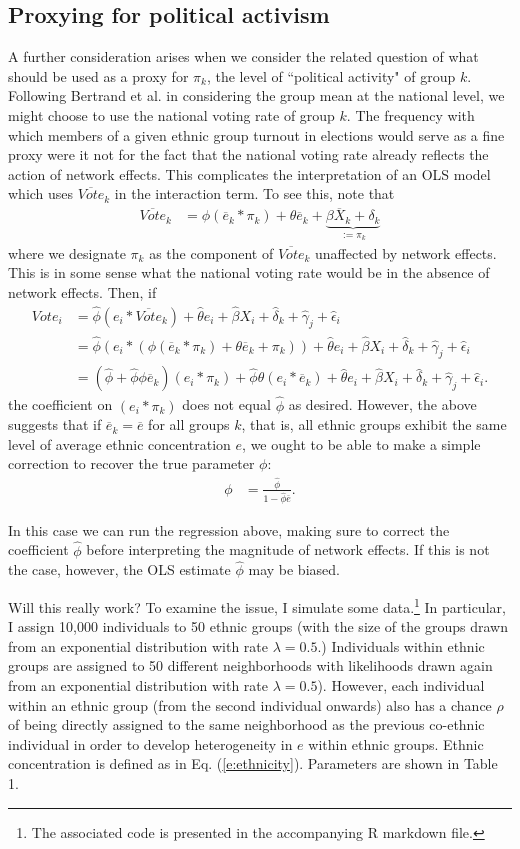 \documentclass[11pt, oneside]{article}   	%
\newcommand{\eq}[1]{\begin{align}#1\end{align}}
\newcommand{\eqs}[1]{\begin{align*}#1\end{align*}}
\begin{document}
\subsection{Proxying for political activism}
A further consideration arises when we consider the related question of what should be used as a proxy for $\pi_k$, the level of ``political activity" of group $k$. Following Bertrand et al. in considering the group mean at the national level, we might choose to use the national voting rate of group $k$. The frequency with which members of a given ethnic group turnout in elections would serve as a fine proxy were it not for the fact that the national voting rate already reflects the action of network effects. This complicates the interpretation of an OLS model which uses $\overline{Vote}_k$ in the interaction term. To see this, note that
\eqs{
	\overline{Vote}_k &= \phi (\overline{e}_k * \pi_k) + \theta \overline{e}_k + \underbrace{\beta \overline{X}_k + \delta_k}_{:=\pi_k}
}
where we designate $\pi_k$ as the component of $\overline{Vote}_k$ unaffected by network effects. This is in some sense what the national voting rate would be in the absence of network effects. Then, if
\eq{
	Vote_i &= \hat\phi (e_i * \overline{Vote}_k) + \hat\theta e_i + \hat\beta X_i + \hat\delta_k + \hat\gamma_j + \hat\epsilon_i  \label{e:spec}\\
	&=\hat\phi (e_i * (\phi (\overline{e}_k * \pi_k) + \theta \overline{e}_k + \pi_k)) + \hat\theta e_i + \hat\beta X_i + \hat\delta_k + \hat\gamma_j + \hat\epsilon_i \nonumber \\ 
	&=(\hat\phi+\hat\phi\phi\overline{e}_k)(e_i * \pi_k) + \hat\phi \theta (e_i * \overline{e}_k) + \hat\theta e_i + \hat\beta X_i + \hat\delta_k + \hat\gamma_j + \hat\epsilon_i. \nonumber
}
the coefficient on $(e_i * \pi_k)$ does not equal $\hat\phi$ as desired. However, the above suggests that if $\overline{e}_k=\overline{e}$ for all groups $k$, that is, all ethnic groups exhibit the same level of average ethnic concentration $e$, we ought to be able to make a simple correction to recover the true parameter $\phi$:
\eq{
	\phi &= \frac{\hat\phi}{1-\hat\phi \overline{e}}. \label{e:correction}
}

In this case we can run the regression above, making sure to correct the coefficient $\hat\phi$ before interpreting the magnitude of network effects. If this is not the case, however, the OLS estimate $\hat\phi$ may be biased. 

Will this really work? To examine the issue, I simulate some data.\footnote{The associated code is presented in the accompanying R markdown file.} In particular, I assign 10,000 individuals to 50 ethnic groups (with the size of the groups drawn from an exponential distribution with rate $\lambda=0.5$.) Individuals within ethnic groups are assigned to 50 different neighborhoods with likelihoods drawn again from an exponential distribution with rate $\lambda=0.5$). However, each individual within an ethnic group (from the second individual onwards) also has a chance $\rho$ of being directly assigned to the same neighborhood as the previous co-ethnic individual in order to develop heterogeneity in $e$ within ethnic groups. Ethnic concentration is defined as in Eq. (\ref{e:ethnicity}). Parameters are shown in Table 1.
\end{document}
